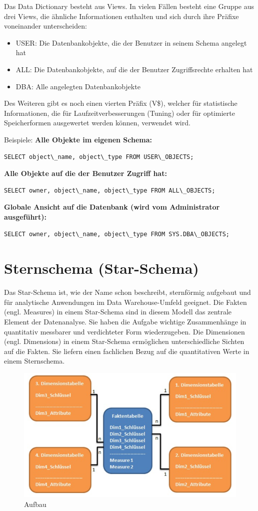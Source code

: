 Das Data Dictionary besteht aus Views. In vielen Fällen besteht eine Gruppe aus drei Views, die ähnliche Informationen enthalten und sich durch ihre Präfixe voneinander unterscheiden:

\begin{itemize}
    \item USER: Die Datenbankobjekte, die der Benutzer in seinem Schema angelegt hat
    \item ALL: Die Datenbankobjekte, auf die der Benutzer Zugriffsrechte erhalten hat 
    \item DBA: Alle angelegten Datenbankobjekte
\end{itemize}

Des Weiteren gibt es noch einen vierten Präfix (V\$), welcher für statistische Informationen, die für Laufzeitverbesserungen (Tuning) oder für optimierte Speicherformen ausgewertet werden können, verwendet wird.

Beispiele:
\textbf{Alle Objekte im eigenen Schema:}
\begin{lstlisting}
SELECT object\_name, object\_type FROM USER\_OBJECTS;    
\end{lstlisting}
\textbf{Alle Objekte auf die der Benutzer Zugriff hat:}
\begin{lstlisting}
SELECT owner, object\_name, object\_type FROM ALL\_OBJECTS;
\end{lstlisting}
\textbf{Globale Ansicht auf die Datenbank (wird vom Administrator ausgeführt):}
\begin{lstlisting}
SELECT owner, object\_name, object\_type FROM SYS.DBA\_OBJECTS;
\end{lstlisting}

\section{Sternschema (Star-Schema)}

Das Star-Schema ist, wie der Name schon beschreibt, sternförmig aufgebaut und für analytische Anwendungen im Data Warehouse-Umfeld geeignet.
Die Fakten (engl. Measures) in einem Star-Schema sind in diesem Modell das zentrale Element der Datenanalyse. Sie haben die Aufgabe wichtige Zusammenhänge in quantitativ messbarer und verdichteter Form wiederzugeben.
Die Dimensionen (engl. Dimensions) in einem Star-Schema ermöglichen unterschiedliche Sichten auf die Fakten. Sie liefern einen fachlichen Bezug auf die quantitativen Werte in einem Sternschema.

\begin{figure}[H]
    \centering
    \includegraphics[width=.4\textwidth]{Content/images/modellierung/star.png}
    \caption{Aufbau}
    \label{fig:modellierung:star}
\end{figure}

